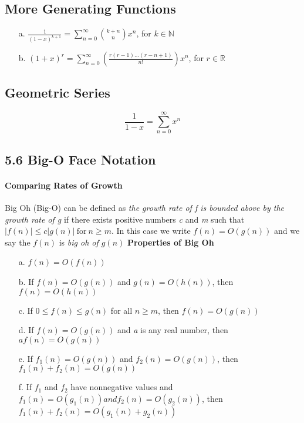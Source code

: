 \documentclass[10pt,twocolumn]{article}
\begin{document}
	\subsection*{More Generating Functions}
		\begin{itemize}
		\item[a.] $\frac{1}{(1-x)^{k+1}}=\sum_{n=0}^\infty \binom{k+n}{n}x^n$, for $k \in \mathbb{N}$
		\item[b.] $(1+x)^r=\sum_{n=0}^\infty (\frac{r(r-1)\ldots(r-n+1)}{n!})x^n$, for $r \in \mathbb{R}$
		\end{itemize}
	\subsection*{Geometric Series}
		\[\frac{1}{1-x}=\sum_{n=0}^\infty x^n\]
	
	\subsection*{5.6 Big-O Face Notation}
        \paragraph*{Comparing Rates of Growth}
        Big Oh (Big-O) can be defined as \textit{the growth rate of f is
          bounded above by the growth rate of g} if there exists positive
        numbers \textit{c} and \textit{m} such that $|f(n)| \leq
        c|g(n)| \: \textrm{for}\: n\geq m$. In this case we write $f(n)
        = O(g(n))$ and we say the $f(n)$ is \textit{big oh of $g(n)$}
        \textbf{Properties of Big Oh}
       \begin{itemize}
        \item[a.] $f(n)=O(f(n))$
        \item[b.] If $f(n)=O(g(n))$ and $ g(n)=O(h(n))$, then $f(n)=O(h(n))$
        \item[c.] If $0\leq f(n) \leq g(n)$ for all $n \geq m$, then $f(n)=O(g(n))$
        \item[d.] If $f(n)=O(g(n))$ and \textit{a} is any real number, then $af(n)=O(g(n))$
        \item[e.] If $f_1(n)=O(g(n))$ and $f_2(n)=O(g(n))$, then $f_1(n) + f_2(n) = O(g(n))$
        \item[f.] If $f_1$ and $f_2$ have nonnegative values and
          $f_1(n) = O(g_1(n)) and f_2(n) = O(g_2(n))$, then $f_1(n) +
          f_2(n) = O(g_1(n) + g_2(n))$
	\end{itemize}
	
\end{document}
